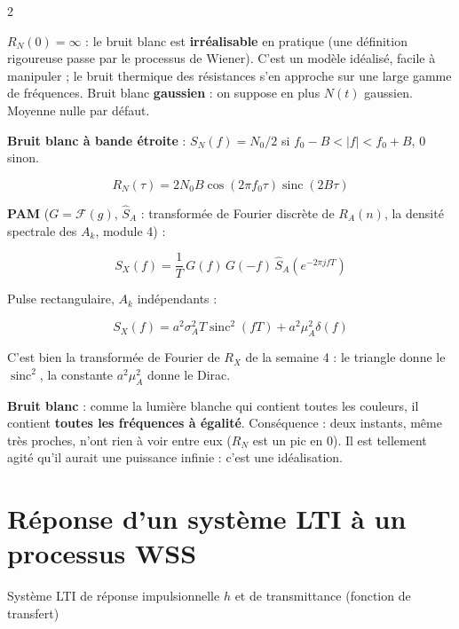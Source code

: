 \documentclass[a4paper,9pt]{extarticle}
\begin{document}
\begin{multicols}{2}
\begin{warning}
$R_N(0) = \infty$ : le bruit blanc est \textbf{irréalisable} en pratique (une définition
rigoureuse passe par le processus de Wiener). C'est un modèle idéalisé, facile à manipuler ;
le bruit thermique des résistances s'en approche sur une large gamme de fréquences. Bruit blanc
\textbf{gaussien} : on suppose en plus $N(t)$ gaussien. Moyenne nulle par défaut.

\end{warning}


\begin{example}

\textbf{Bruit blanc à bande étroite} : $S_N(f) = N_0/2$ si $f_0 - B < |f| < f_0 + B$, 0 sinon.

\[
R_N(\tau) = 2N_0B\cos(2\pi f_0\tau)\operatorname{sinc}(2B\tau)
\]

\textbf{PAM} ($G = \mathcal F(g)$, $\hat S_A$ : transformée de Fourier discrète de $R_A(n)$,
la densité spectrale des $A_k$, module 4) :

\[
S_X(f) = \frac1T\,G(f)\,G(-f)\,\hat S_A(e^{-2\pi jfT})
\]

Pulse rectangulaire, $A_k$ indépendants :

\[
S_X(f) = a^2\sigma_A^2T\operatorname{sinc}^2(fT) + a^2\mu_A^2\delta(f)
\]

C'est bien la transformée de Fourier de $R_X$ de la semaine 4 : le triangle donne le
$\operatorname{sinc}^2$, la constante $a^2\mu_A^2$ donne le Dirac.

\end{example}


\begin{simple}

\textbf{Bruit blanc} : comme la lumière blanche qui contient toutes les couleurs, il contient
\textbf{toutes les fréquences à égalité}. Conséquence : deux instants, même très proches, n'ont
rien à voir entre eux ($R_N$ est un pic en 0). Il est tellement agité qu'il aurait une
puissance infinie : c'est une idéalisation.

\end{simple}


\section{Réponse d'un système LTI à un processus WSS}


\begin{definition}

Système LTI de réponse impulsionnelle $h$ et de transmittance (fonction de transfert)


\end{definition}
\end{multicols}
\end{document}
